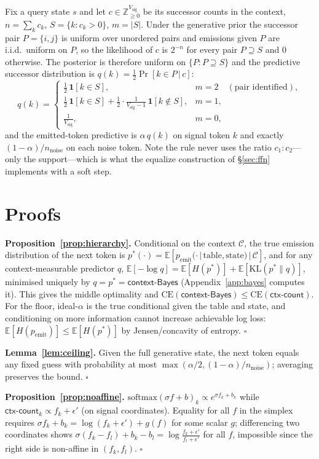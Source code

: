 \documentclass{article} %
\newcommand{\ctxcount}{\textsf{ctx-count}}
\newcommand{\ctxbayes}{\textsf{context-Bayes}}
\newcommand{\idealalpha}{\textsf{ideal-$\alpha$}}
\newcommand{\Vsig}{V_{\mathrm{sig}}}
\newcommand{\nnoise}{n_{\mathrm{noise}}}
\begin{document}
Fix a query state $s$ and let $c\in\mathbb{Z}_{\ge0}^{\Vsig}$ be its successor counts
in the context, $n=\sum_k c_k$, $S=\{k:c_k>0\}$, $m=|S|$. Under the generative prior
the successor pair $P=\{i,j\}$ is uniform over unordered pairs and emissions given
$P$ are i.i.d.\ uniform on $P$, so the likelihood of $c$ is $2^{-n}$ for every pair
$P\supseteq S$ and $0$ otherwise. The posterior is therefore uniform on
$\{P : P\supseteq S\}$ and the predictive successor distribution is
$q(k)=\tfrac{1}{2}\Pr[k\in P\,|\,c]$:
\[
q(k)=
\begin{cases}
\tfrac12\,\mathbf{1}[k\in S], & m=2\quad(\text{pair identified}),\\[2pt]
\tfrac12\,\mathbf{1}[k\in S]+\tfrac12\cdot\tfrac{1}{\Vsig-1}\,\mathbf{1}[k\notin S], & m=1,\\[2pt]
\tfrac{1}{\Vsig}, & m=0,
\end{cases}
\]
and the emitted-token predictive is $\alpha\,q(k)$ on signal token $k$ and exactly
$(1-\alpha)/\nnoise$ on each noise token. Note the rule never uses the ratio
$c_1{:}c_2$---only the support---which is what the equalize construction of
\S\ref{sec:ffn} implements with a soft step.

\section{Proofs}
\label{app:proofs}

\textbf{Proposition~\ref{prop:hierarchy}.} Conditional on the context $\mathcal{C}$,
the true emission distribution of the next token is
$p^{*}(\cdot)=\mathbb{E}[p_{\mathrm{emit}}(\cdot\,|\,\text{table},\text{state})\,|\,\mathcal{C}]$,
and for any context-measurable predictor $q$,
$\mathbb{E}[-\log q]=\mathbb{E}[H(p^{*})]+\mathbb{E}[\mathrm{KL}(p^{*}\|q)]$,
minimised uniquely by $q=p^{*}=\ctxbayes$ (Appendix~\ref{app:bayes} computes it).
This gives the middle optimality and
$\mathrm{CE}(\ctxbayes)\le\mathrm{CE}(\ctxcount)$. For the floor, \idealalpha{} is
the true conditional given the table and state, and conditioning on more information
cannot increase achievable log loss:
$\mathbb{E}[H(p_{\mathrm{emit}})]\le\mathbb{E}[H(p^{*})]$ by Jensen/concavity of
entropy. \hfill$\square$

\textbf{Lemma~\ref{lem:ceiling}.} Given the full generative state, the next token
equals any fixed guess with probability at most
$\max(\alpha/2,(1-\alpha)/\nnoise)$; averaging preserves the bound.
\hfill$\square$

\textbf{Proposition~\ref{prop:noaffine}.} $\mathrm{softmax}(\sigma f+b)_k \propto
e^{\sigma f_k+b_k}$ while $\ctxcount{}_k\propto f_k+\epsilon'$ (on signal
coordinates). Equality for all $f$ in the simplex requires
$\sigma f_k+b_k=\log(f_k+\epsilon')+g(f)$ for some scalar $g$; differencing two
coordinates shows $\sigma(f_k-f_l)+b_k-b_l = \log\frac{f_k+\epsilon'}{f_l+\epsilon'}$
for all $f$, impossible since the right side is non-affine in $(f_k,f_l)$.
\hfill$\square$
\end{document}
